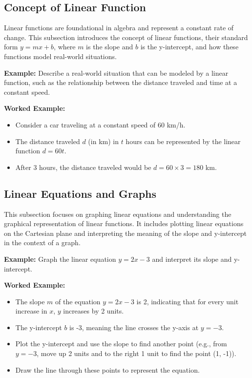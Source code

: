 \documentclass{book}
\begin{document}
\subsection{Concept of Linear Function}
Linear functions are foundational in algebra and represent a constant rate of change. This subsection introduces the concept of linear functions, their standard form \( y = mx + b \), where \( m \) is the slope and \( b \) is the y-intercept, and how these functions model real-world situations.


\textbf{Example:} Describe a real-world situation that can be modeled by a linear function, such as the relationship between the distance traveled and time at a constant speed.


\textbf{Worked Example:}
\begin{itemize}
        \item Consider a car traveling at a constant speed of 60 km/h.
        \item The distance traveled \( d \) (in km) in \( t \) hours can be represented by the linear function \( d = 60t \).
        \item After 3 hours, the distance traveled would be \( d = 60 \times 3 = 180 \) km.
\end{itemize}


\subsection{Linear Equations and Graphs}
This subsection focuses on graphing linear equations and understanding the graphical representation of linear functions. It includes plotting linear equations on the Cartesian plane and interpreting the meaning of the slope and y-intercept in the context of a graph.


\textbf{Example:} Graph the linear equation \( y = 2x - 3 \) and interpret its slope and y-intercept.


\textbf{Worked Example:}
\begin{itemize}
        \item The slope \( m \) of the equation \( y = 2x - 3 \) is 2, indicating that for every unit increase in \( x \), \( y \) increases by 2 units.
        \item The y-intercept \( b \) is -3, meaning the line crosses the y-axis at \( y = -3 \).
        \item Plot the y-intercept and use the slope to find another point (e.g., from \( y = -3 \), move up 2 units and to the right 1 unit to find the point (1, -1)).
        \item Draw the line through these points to represent the equation.
\end{itemize}
\end{document}
